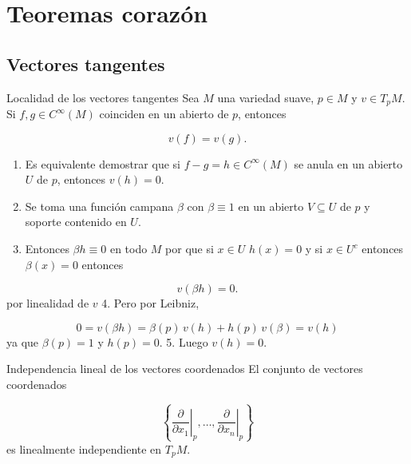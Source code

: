 \chapter{Teoremas corazón}
\label{ch:teoremas-corazon}
\section{Vectores tangentes}
\begin{bookproposition}{Localidad de los vectores tangentes}
Sea $M$ una variedad suave, $p\in M$ y $v\in T_pM$. Si $f,g\in C^\infty(M)$ coinciden en un abierto de $p$, entonces

\[
v(f)=v(g).
\]
\end{bookproposition}
\begin{bookproof}{}
\begin{enumerate}
\item Es equivalente demostrar que si $f-g=h\in C^\infty(M)$ se anula en un abierto $U$ de $p$, entonces $v(h)=0$.
\item Se toma una función campana $\beta$ con $\beta\equiv 1$ en un abierto $V\subseteq U$ de $p$ y soporte contenido en $U$.
\item Entonces $\beta h\equiv 0$ en todo $M$ por que si $x\in U$ $h(x)=0$ y si $x\in U^{c}$ entonces $\beta(x)=0$ entonces
\end{enumerate}
\[
v(\beta h)=0.
\]
por linealidad de $v$ 4. Pero por Leibniz,

\[
0=v(\beta h)=\beta(p)\,v(h)+h(p)\,v(\beta)=v(h)
\]
ya que $\beta(p)=1$ y $h(p)=0$. 5. Luego $v(h)=0$.

\bookqed
\end{bookproof}
\begin{bookproposition}{Independencia lineal de los vectores coordenados}
El conjunto de vectores coordenados

\[
\left\{\left.\frac{\partial}{\partial x_1}\right|_p,\dots,\left.\frac{\partial}{\partial x_n}\right|_p\right\}
\]
es linealmente independiente en $T_pM$.

\end{bookproposition}

